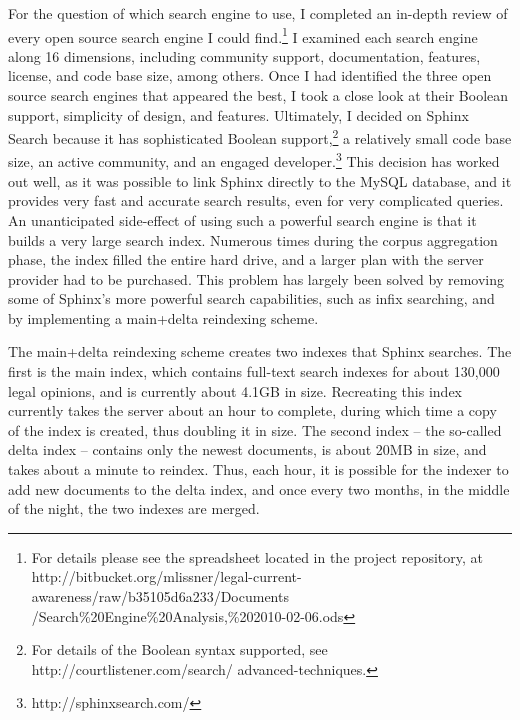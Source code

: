 For the question of which search engine to use, I completed an in-depth review of every open source search engine I could find.\footnote{For details please see the spreadsheet located in the project repository, at http://bitbucket.org/mlissner/legal-current-awareness/raw/b35105d6a233/Documents /Search\%20Engine\%20Analysis,\%202010-02-06.ods} I examined each search engine along 16 dimensions, including community support, documentation, features, license, and code base size, among others. Once I had identified the three open source search engines that appeared the best, I took a close look at their Boolean support, simplicity of design, and features. Ultimately, I decided on Sphinx Search because it has sophisticated Boolean support,\footnote{For details of the Boolean syntax supported, see http://courtlistener.com/search/ advanced-techniques.} a relatively small code base size, an active community, and an engaged developer.\footnote{http://sphinxsearch.com/} This decision has worked out well, as it was possible to link Sphinx directly to the MySQL database, and it provides very fast and accurate search results, even for very complicated queries. An unanticipated side-effect of using such a powerful search engine is that it builds a very large search index. Numerous times during the corpus aggregation phase, the index filled the entire hard drive, and a larger plan with the server provider had to be purchased. This problem has largely been solved by removing some of Sphinx's more powerful search capabilities, such as infix searching, and by implementing a main+delta reindexing scheme. 

The main+delta reindexing scheme creates two indexes that Sphinx searches. The first is the main index, which contains full-text search indexes for about 130,000 legal opinions, and is currently about 4.1GB in size. Recreating this index currently takes the server about an hour to complete, during which time a copy of the index is created, thus doubling it in size. The second index -- the so-called delta index -- contains only the newest documents, is about 20MB in size, and takes about a minute to reindex. Thus, each hour, it is possible for the indexer to add new documents to the delta index, and once every two months, in the middle of the night, the two indexes are merged.


